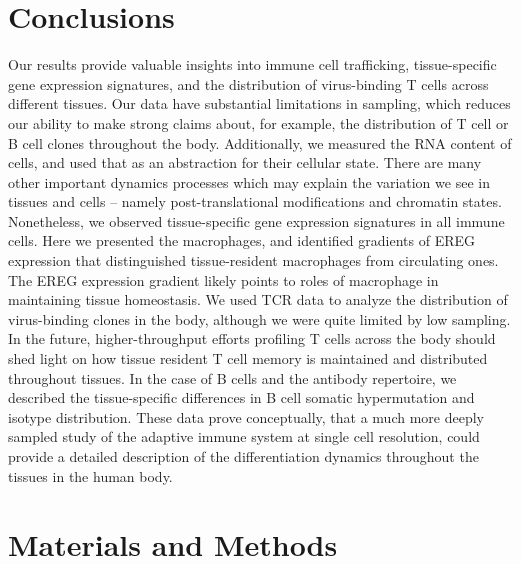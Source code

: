 \section{Conclusions}

Our results provide valuable insights into immune cell trafficking, tissue-specific gene expression signatures, and the distribution of virus-binding T cells across different tissues. Our data have substantial limitations in sampling, which reduces our ability to make strong claims about, for example, the distribution of T cell or B cell clones throughout the body. Additionally, we measured the RNA content of cells, and used that as an abstraction for their cellular state. There are many other important dynamics processes which may explain the variation we see in tissues and cells -- namely post-translational modifications and chromatin states. Nonetheless, we observed tissue-specific gene expression signatures in all immune cells. Here we presented the macrophages, and identified gradients of EREG expression that distinguished tissue-resident macrophages from circulating ones. The EREG expression gradient likely points to roles of macrophage in maintaining tissue homeostasis. We used TCR data to analyze the distribution of virus-binding clones in the body, although we were quite limited by low sampling. In the future, higher-throughput efforts profiling T cells across the body should shed light on how tissue resident T cell memory is maintained and distributed throughout tissues. In the case of B cells and the antibody repertoire, we described the tissue-specific differences in B cell somatic hypermutation and isotype distribution. These data prove conceptually, that a much more deeply sampled study of the adaptive immune system at single cell resolution, could provide a detailed description of the differentiation dynamics throughout the tissues in the human body.

\section{Materials and Methods}
